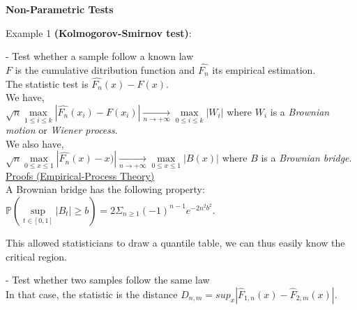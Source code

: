 {\fontsize{12pt}{22pt} \textbf{Non-Parametric Tests}\par}

\vspace{5mm}

Example 1 \textbf{(Kolmogorov-Smirnov test)}: 

\vspace{5mm}

- Test whether a sample follow a known law \\

$F$ is the cumulative ditribution function and $\widehat{F_n}$ its empirical estimation. \\

The statistic test is $\widehat{F_n}(x) - F(x)$. \\

We have, \\

$\sqrt{n} \underset{1 \leq i \leq k}{\operatorname{max}}|\widehat{F_n}(x_i) - F(x_i)| \underset{n \rightarrow + \infty}{\rightarrow} \underset{0 \leq i \leq k}{\operatorname{max}}|W_i|$ where $W_i$ is a \textit{Brownian motion} or \textit{Wiener process}.\\

We also have, \\

$\sqrt{n} \underset{0 \leq x \leq 1}{\operatorname{max}}|\widehat{F_n}(x) -x)| \underset{n \rightarrow + \infty}{\rightarrow} \underset{0 \leq x \leq 1}{\operatorname{max}}|B(x)|$ where $B$ is a \textit{Brownian bridge}.\\

\href{http://www.math.utah.edu/~davar/ps-pdf-files/Kolmogorov-Smirnov.pdf}{Proofs (Empirical-Process Theory)} \\

A Brownian bridge has the following property: \\

$\mathbb{P}(\underset{t \in [0,1]}{\operatorname{sup}}|B_t| \geq b) = 2 \Sigma_{n \geq 1}(-1)^{n-1}e^{-2n^2b^2}$.

This allowed statisticians to draw a quantile table, we can thus easily know the critical region.

\vspace{5mm}

- Test whether two samples follow the same law \\

In that case, the statistic is the distance $D_{n,m} = sup_x |\widehat{F}_{1,n}(x) - \widehat{F}_{2,m}(x)|$. \\


